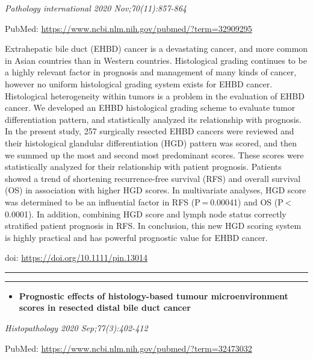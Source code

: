\documentclass[
]{article}
\providecommand{\tightlist}{%
  \setlength{\itemsep}{0pt}\setlength{\parskip}{0pt}}
\begin{document}
\emph{Pathology international 2020 Nov;70(11):857-864}

PubMed: \url{https://www.ncbi.nlm.nih.gov/pubmed/?term=32909295}

Extrahepatic bile duct (EHBD) cancer is a devastating cancer, and more
common in Asian countries than in Western countries. Histological
grading continues to be a highly relevant factor in prognosis and
management of many kinds of cancer, however no uniform histological
grading system exists for EHBD cancer. Histological heterogeneity within
tumors is a problem in the evaluation of EHBD cancer. We developed an
EHBD histological grading scheme to evaluate tumor differentiation
pattern, and statistically analyzed its relationship with prognosis. In
the present study, 257 surgically resected EHBD cancers were reviewed
and their histological glandular differentiation (HGD) pattern was
scored, and then we summed up the most and second most predominant
scores. These scores were statistically analyzed for their relationship
with patient prognosis. Patients showed a trend of shortening
recurrence-free survival (RFS) and overall survival (OS) in association
with higher HGD scores. In multivariate analyses, HGD score was
determined to be an influential factor in RFS (P = 0.00041) and OS
(P \textless{} 0.0001). In addition, combining HGD score and lymph node
status correctly stratified patient prognosis in RFS. In conclusion,
this new HGD scoring system is highly practical and has powerful
prognostic value for EHBD cancer.

doi: \url{https://doi.org/10.1111/pin.13014}

\begin{center}\rule{0.5\linewidth}{0.5pt}\end{center}

\begin{center}\rule{0.5\linewidth}{0.5pt}\end{center}

\begin{itemize}
\tightlist
\item
  \textbf{Prognostic effects of histology-based tumour microenvironment
  scores in resected distal bile duct cancer}
\end{itemize}

\emph{Histopathology 2020 Sep;77(3):402-412}

PubMed: \url{https://www.ncbi.nlm.nih.gov/pubmed/?term=32473032}
\end{document}
